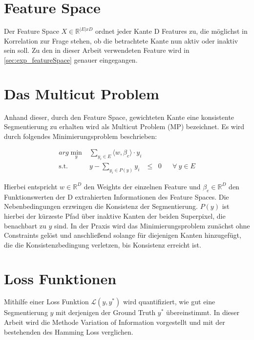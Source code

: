 \section{Feature Space}\label{sec:featureSpace}

Der Feature Space $X \in \mathbb{R}^{|E|xD}$ ordnet jeder Kante D Features zu, die möglichst in Korrelation zur Frage stehen, ob die betrachtete Kante nun aktiv oder inaktiv sein soll. Zu den in dieser Arbeit verwendeten Feature wird in \ref{sec:exp_featureSpace} genauer eingegangen.



\section{Das Multicut Problem}\label{sec:multicutProb}

Anhand dieser, durch den Feature Space, gewichteten Kante eine konsistente Segmentierung zu erhalten wird als Multicut Problem (MP) bezeichnet. Es wird durch folgendes Minimierungsproblem beschrieben: 


\begin{equation} 
\begin{array}{rrclcl}
\displaystyle arg \min_{y} & \sum\limits_{y_i \in E} \langle w, \beta_e \rangle \cdot y_i \\
\textrm{s.t.} &  y - \sum\limits_{y_i \in P(y)} y_i & \le & 0 & & \forall \ y \in E
\end{array}
\label{eq:mp}
\end{equation}


Hierbei entspricht $w \in \mathbb{R}^D$ den Weights der einzelnen Feature und $\beta_e \in \mathbb{R}^D$ den Funktionswerten der D extrahierten Informationen des Feature Spaces. Die Nebenbedingungen erzwingen die Konsistenz der Segmentierung. $P(y)$ ist hierbei der kürzeste Pfad über inaktive Kanten der beiden Superpixel, die benachbart zu $y$ sind. In der Praxis wird das Minimierungsproblem zunächst ohne Constraints gelöst und anschließend solange für diejenigen Kanten hinzugefügt, die die Konsistenzbedingung verletzen, bis Konsistenz erreicht ist.

\section{Loss Funktionen}\label{sec:loss-fkts}

Mithilfe einer Loss Funktion $\mathcal{L}(y, y^*)$ wird quantifiziert, wie gut eine Segmentierung $y$ mit derjenigen der Ground Truth $y^*$ übereinstimmt. In dieser Arbeit wird die Methode Variation of Information vorgestellt und mit der bestehenden des Hamming Loss verglichen.

